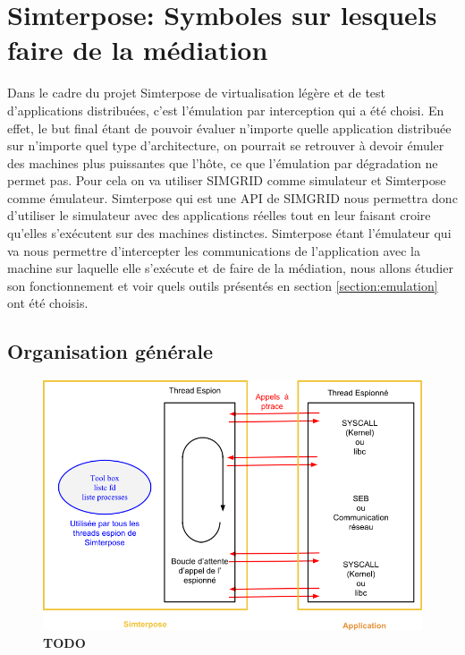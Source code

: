 
\section{Simterpose: Symboles sur lesquels faire de la médiation}
\label{section:simterpose}
Dans le cadre du projet Simterpose de virtualisation légère et de test
d'applications distribuées, c'est l'émulation par interception qui a été
choisi. En effet, le but final étant de pouvoir évaluer n'importe quelle
application distribuée sur n'importe quel type d'architecture, on pourrait se
retrouver à devoir émuler des machines plus puissantes que l'hôte, ce que
l'émulation par dégradation ne permet pas. Pour cela on va utiliser SIMGRID
comme simulateur et Simterpose comme émulateur. Simterpose qui est une API de
SIMGRID nous permettra donc d'utiliser le simulateur avec des applications
réelles tout en leur faisant croire qu'elles s'exécutent sur des machines
distinctes. Simterpose étant l'émulateur qui va nous permettre d'intercepter les
communications de l'application avec la machine sur laquelle elle s'exécute et
de faire de la médiation, nous allons étudier son fonctionnement et voir quels
outils présentés en section \ref{section:emulation} ont été choisis.

\subsection{Organisation générale}
\begin{figure}[H]
  \centering
  \includegraphics[scale=0.50]{Pictures/png/Organisation_generale_code_Simterpose_v2.png}
  \caption{{\color{red} \textbf{TODO}}}
  \label{Organisation_Simterpose}
\end{figure}

